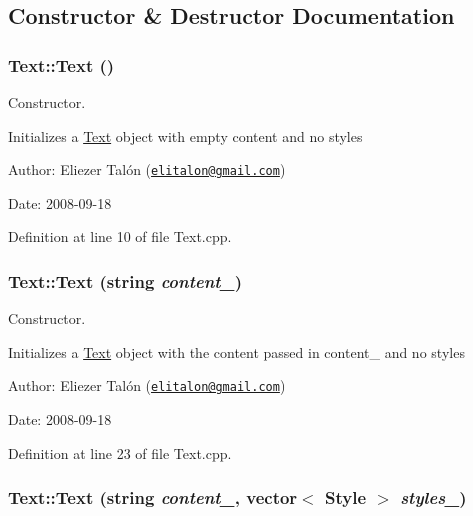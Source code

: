 \subsection{Constructor \& Destructor Documentation}
\hypertarget{class_text_b3e26143fccc52699bcc5149cae852bc}{
\subsubsection[Text]{\setlength{\rightskip}{0pt plus 5cm}Text::Text ()}}
\label{class_text_b3e26143fccc52699bcc5149cae852bc}


Constructor. 

Initializes a \hyperlink{class_text}{Text} object with empty content and no styles

\begin{Desc}
\item[Author:]Eliezer Talón (\href{mailto:elitalon@gmail.com}{\tt elitalon@gmail.com}) \end{Desc}
\begin{Desc}
\item[Date:]2008-09-18 \end{Desc}


Definition at line 10 of file Text.cpp.\hypertarget{class_text_9363c2495337f85a6e29621a7c4e86f9}{
\subsubsection[Text]{\setlength{\rightskip}{0pt plus 5cm}Text::Text (string {\em content\_\-})}}
\label{class_text_9363c2495337f85a6e29621a7c4e86f9}


Constructor. 

Initializes a \hyperlink{class_text}{Text} object with the content passed in content\_\- and no styles

\begin{Desc}
\item[Author:]Eliezer Talón (\href{mailto:elitalon@gmail.com}{\tt elitalon@gmail.com}) \end{Desc}
\begin{Desc}
\item[Date:]2008-09-18 \end{Desc}


Definition at line 23 of file Text.cpp.\hypertarget{class_text_1b252646fc8feb154868c4138f610bfc}{
\subsubsection[Text]{\setlength{\rightskip}{0pt plus 5cm}Text::Text (string {\em content\_\-}, \/  vector$<$ {\bf Style} $>$ {\em styles\_\-})}}
\label{class_text_1b252646fc8feb154868c4138f610bfc}


